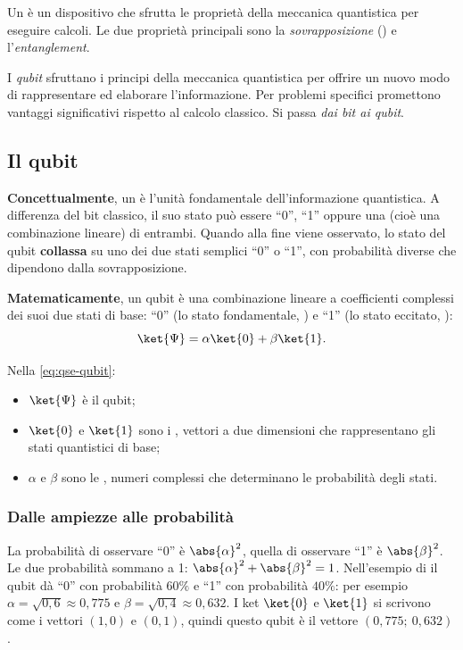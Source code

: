 \begin{definizione}
Un  è un dispositivo che sfrutta le proprietà della meccanica quantistica per eseguire
calcoli. Le due proprietà principali sono la \emph{sovrapposizione} () e l'\emph{entanglement}.
\end{definizione}

I \emph{qubit} sfruttano i principi della meccanica quantistica per offrire un nuovo modo di rappresentare ed elaborare
l'informazione. Per problemi specifici promettono vantaggi significativi rispetto al calcolo classico. Si passa
\emph{dai bit ai qubit}.

\subsection{Il qubit}
\label{sec:qse-qubit}

\begin{definizione}[Qubit]
\textbf{Concettualmente}, un  è l'unità fondamentale dell'informazione quantistica. A differenza del bit
classico, il suo stato può essere ``0'', ``1'' oppure una  (cioè una combinazione lineare) di
entrambi. Quando alla fine viene osservato, lo stato del qubit \textbf{collassa} su uno dei due stati semplici ``0'' o
``1'', con probabilità diverse che dipendono dalla sovrapposizione.

\textbf{Matematicamente}, un qubit è una combinazione lineare a coefficienti complessi dei suoi due stati di base:
``0'' (lo stato fondamentale, ) e ``1'' (lo stato eccitato, ):
\begin{equation}
\label{eq:qse-qubit}
\ket{\Psi} = \alpha\ket{0} + \beta\ket{1}.
\end{equation}
\end{definizione}

Nella \eqref{eq:qse-qubit}:
\begin{itemize}
  \item $\ket{\Psi}$ è il qubit;
  \item $\ket{0}$ e $\ket{1}$ sono i , vettori a due dimensioni che rappresentano gli stati quantistici di
    base;
  \item $\alpha$ e $\beta$ sono le , numeri complessi che determinano le probabilità degli stati.
\end{itemize}

\subsubsection{Dalle ampiezze alle probabilità\aggiunta}
La probabilità di osservare ``0'' è $\abs{\alpha}^2$, quella di osservare ``1'' è $\abs{\beta}^2$. Le due probabilità
sommano a 1: $\abs{\alpha}^2 + \abs{\beta}^2 = 1$. Nell'esempio di  il qubit dà ``0'' con
probabilità $60\%$ e ``1'' con probabilità $40\%$: per esempio $\alpha = \sqrt{0{,}6} \approx 0{,}775$ e
$\beta = \sqrt{0{,}4} \approx 0{,}632$. I ket $\ket{0}$ e $\ket{1}$ si scrivono come i vettori $(1, 0)$ e $(0, 1)$,
quindi questo qubit è il vettore $(0{,}775;\ 0{,}632)$.

